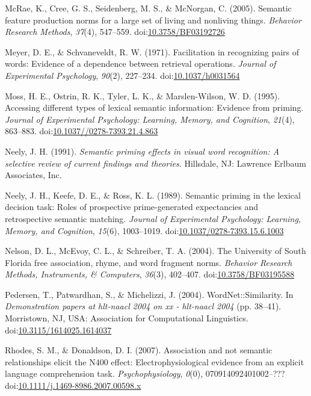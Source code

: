 \documentclass[english,man]{apa6}
\theoremstyle{definition}
\theoremstyle{definition}
\theoremstyle{remark}
\begin{document}
\hypertarget{ref-McRae2005}{}
McRae, K., Cree, G. S., Seidenberg, M. S., \& McNorgan, C. (2005).
Semantic feature production norms for a large set of living and
nonliving things. \emph{Behavior Research Methods}, \emph{37}(4),
547--559.
doi:\href{https://doi.org/10.3758/BF03192726}{10.3758/BF03192726}

\hypertarget{ref-Meyer1971}{}
Meyer, D. E., \& Schvaneveldt, R. W. (1971). Facilitation in recognizing
pairs of words: Evidence of a dependence between retrieval operations.
\emph{Journal of Experimental Psychology}, \emph{90}(2), 227--234.
doi:\href{https://doi.org/10.1037/h0031564}{10.1037/h0031564}

\hypertarget{ref-Moss1995}{}
Moss, H. E., Ostrin, R. K., Tyler, L. K., \& Marslen-Wilson, W. D.
(1995). Accessing different types of lexical semantic information:
Evidence from priming. \emph{Journal of Experimental Psychology:
Learning, Memory, and Cognition}, \emph{21}(4), 863--883.
doi:\href{https://doi.org/10.1037//0278-7393.21.4.863}{10.1037//0278-7393.21.4.863}

\hypertarget{ref-Neely1991}{}
Neely, J. H. (1991). \emph{Semantic priming effects in visual word
recognition: A selective review of current findings and theories}.
Hillsdale, NJ: Lawrence Erlbaum Associates, Inc.

\hypertarget{ref-Neely1989}{}
Neely, J. H., Keefe, D. E., \& Ross, K. L. (1989). Semantic priming in
the lexical decision task: Roles of prospective prime-generated
expectancies and retrospective semantic matching. \emph{Journal of
Experimental Psychology: Learning, Memory, and Cognition}, \emph{15}(6),
1003--1019.
doi:\href{https://doi.org/10.1037/0278-7393.15.6.1003}{10.1037/0278-7393.15.6.1003}

\hypertarget{ref-Nelson2004}{}
Nelson, D. L., McEvoy, C. L., \& Schreiber, T. A. (2004). The University
of South Florida free association, rhyme, and word fragment norms.
\emph{Behavior Research Methods, Instruments, \& Computers},
\emph{36}(3), 402--407.
doi:\href{https://doi.org/10.3758/BF03195588}{10.3758/BF03195588}

\hypertarget{ref-Pedersen2004}{}
Pedersen, T., Patwardhan, S., \& Michelizzi, J. (2004).
WordNet::Similarity. In \emph{Demonstration papers at hlt-naacl 2004 on
xx - hlt-naacl 2004} (pp. 38--41). Morristown, NJ, USA: Association for
Computational Linguistics.
doi:\href{https://doi.org/10.3115/1614025.1614037}{10.3115/1614025.1614037}

\hypertarget{ref-Rhodes2007}{}
Rhodes, S. M., \& Donaldson, D. I. (2007). Association and not semantic
relationships elicit the N400 effect: Electrophysiological evidence from
an explicit language comprehension task. \emph{Psychophysiology},
\emph{0}(0), 070914092401002--???
doi:\href{https://doi.org/10.1111/j.1469-8986.2007.00598.x}{10.1111/j.1469-8986.2007.00598.x}
\end{document}
